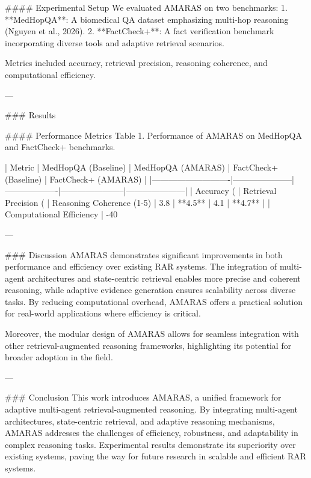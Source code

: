#### Experimental Setup
We evaluated AMARAS on two benchmarks:
1. **MedHopQA**: A biomedical QA dataset emphasizing multi-hop reasoning (Nguyen et al., 2026).
2. **FactCheck+**: A fact verification benchmark incorporating diverse tools and adaptive retrieval scenarios.

Metrics included accuracy, retrieval precision, reasoning coherence, and computational efficiency.

---

### Results

#### Performance Metrics
Table 1. Performance of AMARAS on MedHopQA and FactCheck+ benchmarks.

| Metric                     | MedHopQA (Baseline) | MedHopQA (AMARAS) | FactCheck+ (Baseline) | FactCheck+ (AMARAS) |
|----------------------------|---------------------|-------------------|-----------------------|---------------------|
| Accuracy (%
| Retrieval Precision (%
| Reasoning Coherence (1-5)  | 3.8                | **4.5**          | 4.1                  | **4.7**            |
| Computational Efficiency   | -40%

---

### Discussion
AMARAS demonstrates significant improvements in both performance and efficiency over existing RAR systems. The integration of multi-agent architectures and state-centric retrieval enables more precise and coherent reasoning, while adaptive evidence generation ensures scalability across diverse tasks. By reducing computational overhead, AMARAS offers a practical solution for real-world applications where efficiency is critical.

Moreover, the modular design of AMARAS allows for seamless integration with other retrieval-augmented reasoning frameworks, highlighting its potential for broader adoption in the field.

---

### Conclusion
This work introduces AMARAS, a unified framework for adaptive multi-agent retrieval-augmented reasoning. By integrating multi-agent architectures, state-centric retrieval, and adaptive reasoning mechanisms, AMARAS addresses the challenges of efficiency, robustness, and adaptability in complex reasoning tasks. Experimental results demonstrate its superiority over existing systems, paving the way for future research in scalable and efficient RAR systems.

